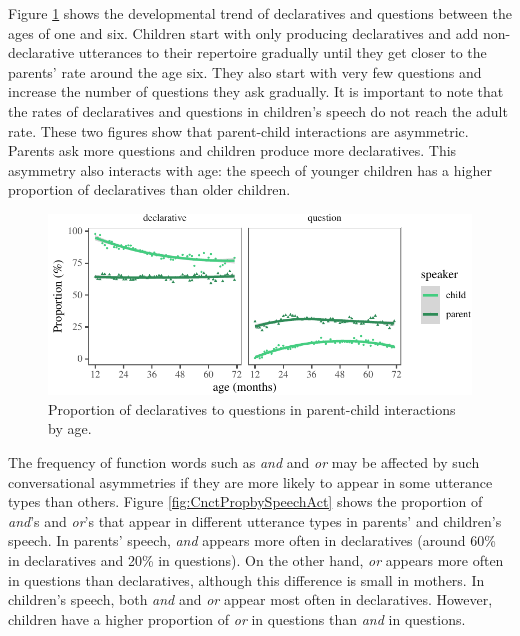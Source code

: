 \documentclass[,man,floatsintext]{apa6}
\begin{document}
Figure \ref{fig:utteranceTypeByAgePlot} shows the developmental trend of declaratives and questions between the ages of one and six. Children start with only producing declaratives and add non-declarative utterances to their repertoire gradually until they get closer to the parents' rate around the age six. They also start with very few questions and increase the number of questions they ask gradually. It is important to note that the rates of declaratives and questions in children's speech do not reach the adult rate. These two figures show that parent-child interactions are asymmetric. Parents ask more questions and children produce more declaratives. This asymmetry also interacts with age: the speech of younger children has a higher proportion of declaratives than older children.

\begin{figure}
\centering
\includegraphics{figs/utteranceTypeByAgePlot-1.pdf}
\caption{\label{fig:utteranceTypeByAgePlot}Proportion of declaratives to questions in parent-child interactions by age.}
\end{figure}

The frequency of function words such as \emph{and} and \emph{or} may be affected by such conversational asymmetries if they are more likely to appear in some utterance types than others. Figure \ref{fig:CnctPropbySpeechAct} shows the proportion of \emph{and}'s and \emph{or}'s that appear in different utterance types in parents' and children's speech. In parents' speech, \emph{and} appears more often in declaratives (around 60\% in declaratives and 20\% in questions). On the other hand, \emph{or} appears more often in questions than declaratives, although this difference is small in mothers. In children's speech, both \emph{and} and \emph{or} appear most often in declaratives. However, children have a higher proportion of \emph{or} in questions than \emph{and} in questions.
\end{document}
